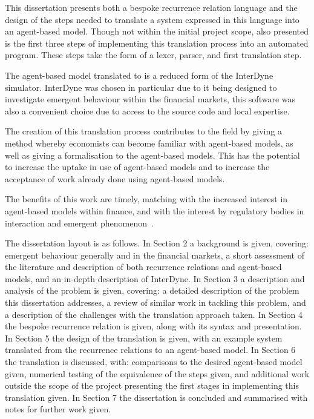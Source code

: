 \documentclass{article}
\begin{document}
This dissertation presents both a bespoke recurrence relation language and the design of the steps needed to translate a system expressed in this language into an agent-based model. Though not within the initial project scope, also presented is the first three steps of implementing this translation process into an automated program. These steps take the form of a lexer, parser, and first translation step. 

The agent-based model translated to is a reduced form of the InterDyne simulator. InterDyne was chosen in particular due to it being designed to investigate emergent behaviour within the financial markets, this software was also a convenient choice due to access to the source code and local expertise.   

The creation of this translation process contributes to the field by giving a method whereby economists can become familiar with agent-based models, as well as giving a formalisation to the agent-based models. This has the potential to increase the uptake in use of agent-based models and to increase the acceptance of work already done using agent-based models. 

The benefits of this work are timely, matching with the increased interest in agent-based models within finance, and with the interest by regulatory bodies in interaction and emergent phenomenon~\cite{fallacyofcompostionBook, newwork1, newabmpaper}.  

The dissertation layout is as follows. In Section 2 a background is given, covering: emergent behaviour generally and in the financial markets, a short assessment of the literature and description of both recurrence relations and agent-based models, and an in-depth description of InterDyne. In Section 3 a description and analysis of the problem is given, covering: a detailed description of the problem this dissertation addresses, a review of similar work in tackling this problem, and a description of the challenges with the translation approach taken. In Section 4 the bespoke recurrence relation is given, along with its syntax and presentation. In Section 5 the design of the translation is given, with an example system translated from the recurrence relations to an agent-based model. In Section 6 the translation is discussed, with: comparisons to the desired agent-based model given, numerical testing of the equivalence of the steps given, and additional work outside the scope of the project presenting the first stages in implementing this translation given. In Section 7 the dissertation is concluded and summarised with notes for further work given.     
\end{document}
